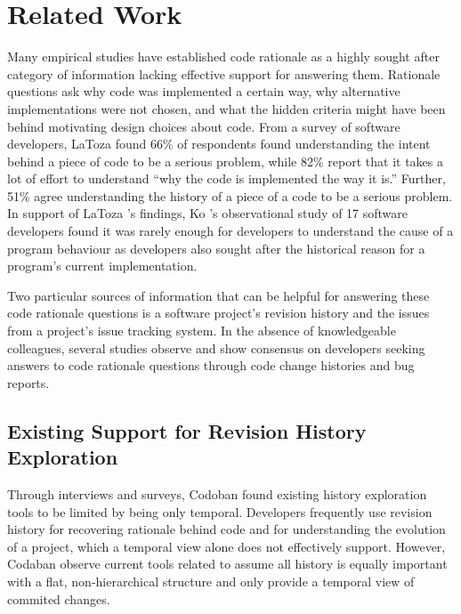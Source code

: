 \chapter{Related Work}
\label{ch:Related-Work}

Many empirical studies have established code rationale as a highly sought after category of information lacking effective support for answering them. \cite{latoza_maintaining_2006, latoza_hard-answer_2010, ko_information_2007}
Rationale questions ask why code was implemented a certain way, why alternative implementations were not chosen, and what the hidden criteria might have been behind motivating design choices about code. \cite{latoza_hard-answer_2010}
From a survey of software developers, LaToza \etal \cite{latoza_maintaining_2006} found 66\% of respondents found understanding the intent behind a piece of code to be a serious problem, 
while 82\% report that it takes a lot of effort to understand ``why the code is implemented the way it is.''
Further, 51\% agree understanding the history of a piece of a code to be a serious problem. \cite{latoza_maintaining_2006}
In support of LaToza \etal's findings, Ko \etal's observational study of 17 software developers found it was rarely enough for developers to understand the cause of a program behaviour as developers also  sought after the historical reason for a program's current implementation. \cite{ko_information_2007}

Two particular sources of information that can be helpful for answering these code rationale questions is a software project's revision history and the issues from a project's issue tracking system. 
In the absence of knowledgeable colleagues, several studies observe and show consensus on developers seeking answers to code rationale questions through code change histories and bug reports. \cite{ko_information_2007, codoban_software_2015, robillard_turnover-induced_2021}

\section{Existing Support for Revision History Exploration}

Through interviews and surveys, Codoban \etal \cite{codoban_software_2015} found existing history exploration tools to be limited by being only temporal.
Developers frequently use revision history for recovering rationale behind code and for understanding the evolution of a project, which a temporal view alone does not effectively support. \cite{codoban_software_2015} 
However, Codaban \etal observe current tools related to  assume all history is equally important with a flat, non-hierarchical structure and only provide a temporal view of commited changes. \cite{codoban_software_2015}

